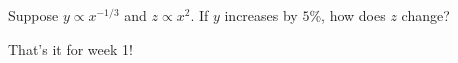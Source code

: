 \documentclass[../main.tex]{subfiles}
\begin{document}
\begin{exercise} \label{ex:allometry-weekly-challenge}
  Suppose \(y \propto x^{-1/3}\) and \(z \propto x^{2}\).  If \(y\) increases by \(5\%\), how does \(z\) change? 

\end{exercise}

That's it for week 1! {}
\end{document}
